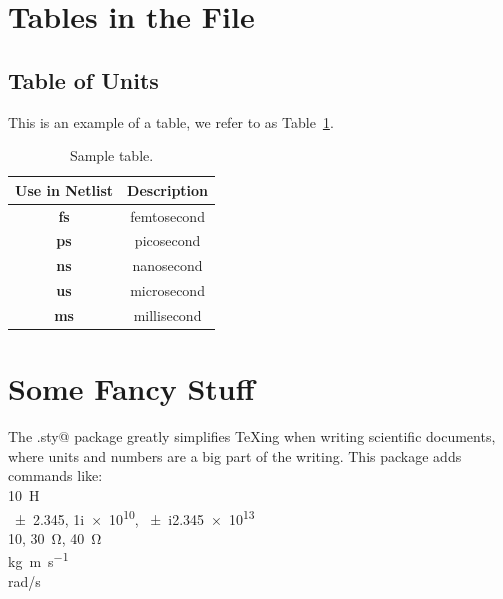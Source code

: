 \documentclass[12pt,oneside]{article}
\begin{document}
\section{Tables in the File} \label{sec:tab}

\subsection{Table of Units} \label{sec:unit}
This is an example of a table, we refer to as Table~\ref{tab:1}.
\begin{singlespace}
\begin{table}[!th]
\centering  
\begin{tabular}{|c|c|}
\hline
{Use in Netlist}   & {Description} \\ \hline
\textbf{fs}        & femtosecond   \\ \hline
\textbf{ps}        & picosecond    \\ \hline
\textbf{ns}        & nanosecond    \\ \hline
\textbf{us}        & microsecond   \\ \hline
\textbf{ms}        & millisecond   \\ \hline
\end{tabular}
\caption{Sample table.}
\label{tab:1}
\end{table}
\end{singlespace}
%
%
\vfill
%
%
\newpage



\newpage    
\appendix
\section{Some Fancy Stuff} \label{app:fancy}
The \verb@siunitx.sty@ package greatly simplifies TeXing when writing scientific documents, where units and numbers are a big part of the writing. This package adds commands like:\\
\SI{10}{\henry} \\
\num{+-2,345},  \num{1ie10},  \num{+-i2,345e13} \\
\SI{10}{\Omega}, \SI{30}{\ohm}, 40~\si{\ohm}\\
\si{\kilogram\metre\per\second} \\
\si{\radian/\second}\\
\end{document}
